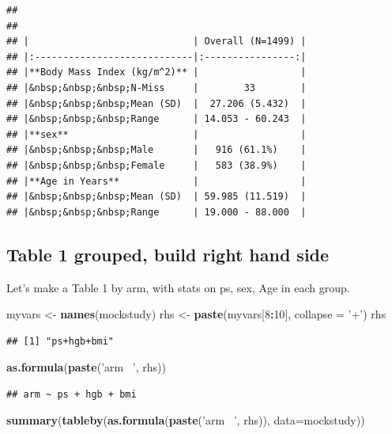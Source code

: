 \documentclass[
]{book}
\newenvironment{Shaded}{\begin{snugshade}}{\end{snugshade}}
\newcommand{\DataTypeTok}[1]{\textcolor[rgb]{0.13,0.29,0.53}{#1}}
\newcommand{\DecValTok}[1]{\textcolor[rgb]{0.00,0.00,0.81}{#1}}
\newcommand{\KeywordTok}[1]{\textcolor[rgb]{0.13,0.29,0.53}{\textbf{#1}}}
\newcommand{\NormalTok}[1]{#1}
\newcommand{\OperatorTok}[1]{\textcolor[rgb]{0.81,0.36,0.00}{\textbf{#1}}}
\newcommand{\StringTok}[1]{\textcolor[rgb]{0.31,0.60,0.02}{#1}}
\begin{document}
\begin{verbatim}
## 
## 
## |                             | Overall (N=1499) |
## |:----------------------------|:----------------:|
## |**Body Mass Index (kg/m^2)** |                  |
## |&nbsp;&nbsp;&nbsp;N-Miss     |        33        |
## |&nbsp;&nbsp;&nbsp;Mean (SD)  |  27.206 (5.432)  |
## |&nbsp;&nbsp;&nbsp;Range      | 14.053 - 60.243  |
## |**sex**                      |                  |
## |&nbsp;&nbsp;&nbsp;Male       |   916 (61.1%)    |
## |&nbsp;&nbsp;&nbsp;Female     |   583 (38.9%)    |
## |**Age in Years**             |                  |
## |&nbsp;&nbsp;&nbsp;Mean (SD)  | 59.985 (11.519)  |
## |&nbsp;&nbsp;&nbsp;Range      | 19.000 - 88.000  |
\end{verbatim}

\hypertarget{table-1-grouped-build-right-hand-side}{%
\subsection{Table 1 grouped, build right hand side}\label{table-1-grouped-build-right-hand-side}}

Let's make a Table 1 by arm, with stats on ps, sex, Age
in each group.

\begin{Shaded}
\begin{Highlighting}[]
\NormalTok{myvars <-}\StringTok{ }\KeywordTok{names}\NormalTok{(mockstudy)}
\NormalTok{rhs <-}\StringTok{ }\KeywordTok{paste}\NormalTok{(myvars[}\DecValTok{8}\OperatorTok{:}\DecValTok{10}\NormalTok{], }\DataTypeTok{collapse =} \StringTok{'+'}\NormalTok{)}
\NormalTok{rhs }
\end{Highlighting}
\end{Shaded}

\begin{verbatim}
## [1] "ps+hgb+bmi"
\end{verbatim}

\begin{Shaded}
\begin{Highlighting}[]
\KeywordTok{as.formula}\NormalTok{(}\KeywordTok{paste}\NormalTok{(}\StringTok{'arm ~'}\NormalTok{, rhs))}
\end{Highlighting}
\end{Shaded}

\begin{verbatim}
## arm ~ ps + hgb + bmi
\end{verbatim}

\begin{Shaded}
\begin{Highlighting}[]
\KeywordTok{summary}\NormalTok{(}\KeywordTok{tableby}\NormalTok{(}\KeywordTok{as.formula}\NormalTok{(}\KeywordTok{paste}\NormalTok{(}\StringTok{'arm ~'}\NormalTok{, rhs)), }\DataTypeTok{data=}\NormalTok{mockstudy))}
\end{Highlighting}
\end{Shaded}
\end{document}
